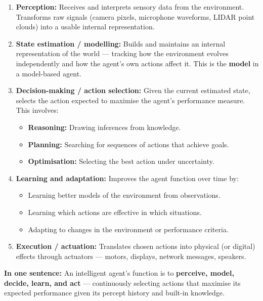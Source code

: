 \documentclass[12pt, a4paper]{article}
\newenvironment{answerbox}{\begin{mdframed}[style=answerframe]}{\end{mdframed}}
\begin{document}
\begin{enumerate}[leftmargin=1.5cm, itemsep=5pt]
  \item \textbf{Perception:} Receives and interprets sensory data from the environment. Transforms raw signals (camera pixels, microphone waveforms, LIDAR point clouds) into a usable internal representation.

  \item \textbf{State estimation / modelling:} Builds and maintains an internal representation of the world — tracking how the environment evolves independently and how the agent's own actions affect it. This is the \textbf{model} in a model-based agent.

  \item \textbf{Decision-making / action selection:} Given the current estimated state, selects the action expected to maximise the agent's performance measure. This involves:
  \begin{itemize}[noitemsep]
    \item \textbf{Reasoning:} Drawing inferences from knowledge.
    \item \textbf{Planning:} Searching for sequences of actions that achieve goals.
    \item \textbf{Optimisation:} Selecting the best action under uncertainty.
  \end{itemize}

  \item \textbf{Learning and adaptation:} Improves the agent function over time by:
  \begin{itemize}[noitemsep]
    \item Learning better models of the environment from observations.
    \item Learning which actions are effective in which situations.
    \item Adapting to changes in the environment or performance criteria.
  \end{itemize}

  \item \textbf{Execution / actuation:} Translates chosen actions into physical (or digital) effects through actuators — motors, displays, network messages, speakers.
\end{enumerate}

\begin{answerbox}
\textbf{In one sentence:} An intelligent agent's function is to \textbf{perceive, model, decide, learn, and act} — continuously selecting actions that maximise its expected performance given its percept history and built-in knowledge.
\end{answerbox}
\end{document}
